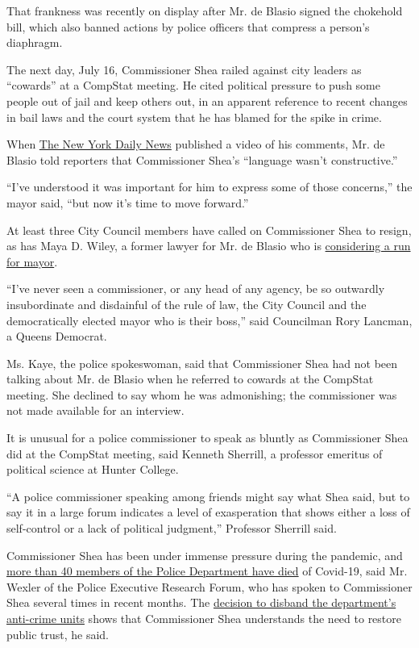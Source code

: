 That frankness was recently on display after Mr. de Blasio signed the
chokehold bill, which also banned actions by police officers that
compress a person's diaphragm.

The next day, July 16, Commissioner Shea railed against city leaders as
``cowards'' at a CompStat meeting. He cited political pressure to push
some people out of jail and keep others out, in an apparent reference to
recent changes in bail laws and the court system that he has blamed for
the spike in crime.

When
\href{https://www.nydailynews.com/new-york/nyc-crime/ny-nypd-commissioner-dermot-shea-calls-city-leaders-cowards-20200718-jqh3qagax5cjda73izzuq3t4xu-story.html}{The
New York Daily News} published a video of his comments, Mr. de Blasio
told reporters that Commissioner Shea's ``language wasn't
constructive.''

``I've understood it was important for him to express some of those
concerns,'' the mayor said, ``but now it's time to move forward.''

At least three City Council members have called on Commissioner Shea to
resign, as has Maya D. Wiley, a former lawyer for Mr. de Blasio who is
\href{https://www.nytimes3xbfgragh.onion/2020/07/28/nyregion/maya-wiley-mayor-nyc.html}{considering
a run for mayor}.

``I've never seen a commissioner, or any head of any agency, be so
outwardly insubordinate and disdainful of the rule of law, the City
Council and the democratically elected mayor who is their boss,'' said
Councilman Rory Lancman, a Queens Democrat.

Ms. Kaye, the police spokeswoman, said that Commissioner Shea had not
been talking about Mr. de Blasio when he referred to cowards at the
CompStat meeting. She declined to say whom he was admonishing; the
commissioner was not made available for an interview.

It is unusual for a police commissioner to speak as bluntly as
Commissioner Shea did at the CompStat meeting, said Kenneth Sherrill, a
professor emeritus of political science at Hunter College.

``A police commissioner speaking among friends might say what Shea said,
but to say it in a large forum indicates a level of exasperation that
shows either a loss of self-control or a lack of political judgment,''
Professor Sherrill said.

Commissioner Shea has been under immense pressure during the pandemic,
and
\href{https://www1.nyc.gov/site/nypd/about/memorials/covid-19-memorial.page}{more
than 40 members of the Police Department have died} of Covid-19, said
Mr. Wexler of the Police Executive Research Forum, who has spoken to
Commissioner Shea several times in recent months. The
\href{https://www.nytimes3xbfgragh.onion/2020/06/15/nyregion/nypd-plainclothes-cops.html}{decision
to disband the department's anti-crime units} shows that Commissioner
Shea understands the need to restore public trust, he said.

